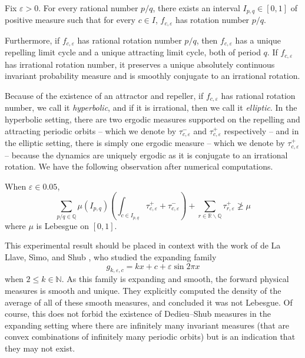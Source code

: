 \documentclass[10pt]{amsart}
\numberwithin{equation}{section}     %
\newcommand{\N}{\mathbb{N}} \newcommand{\Z}{\mathbb{Z}} \newcommand{\Q}{\mathbb{Q}} \newcommand{\R}{\mathbb{R}}
\renewcommand{\setminus}{\smallsetminus}
\renewcommand{\epsilon}{\varepsilon}
\begin{document}
\begin{theorem}
    Fix $\epsilon > 0$. For every rational number $p/q$, there exists an interval $I_{p,q} \in [0,1]$ of positive measure such that for every $c \in I$, $f_{c, \epsilon}$ has rotation number $p/q$.
  
Furthermore, if $f_{c,\epsilon}$ has rational rotation number $p/q$, then $f_{c,\epsilon}$ has a unique repelling limit cycle and a unique attracting limit cycle, both of period $q$. If $f_{c,\epsilon}$ has irrational rotation number, it preserves a unique absolutely continuous invariant probability measure and is smoothly conjugate to an irrational rotation.
\end{theorem}

Because of the existence of an attractor and repeller, if $f_{c,\varepsilon}$ has rational rotation number, we call it \textit{hyperbolic}, and if it is irrational, then we call it \textit{elliptic}. In the hyperbolic setting, there are two ergodic measures supported on the repelling and attracting periodic orbits -- which we denote by $\tau_{c,\varepsilon}^-$ and $\tau_{c,\varepsilon}^+$ respectively -- and in the elliptic setting, there is simply one ergodic measure -- which we denote by $\tau_{c,\varepsilon}^+$ -- because the dynamics are uniquely ergodic as it is conjugate to an irrational rotation.
We have the following observation after numerical computations.

\begin{claim}[Experimental] \label{experiment}
When $\varepsilon \in 0.05$, $$\sum_{p/q \in \Q} \mu(I_{p,q}) \left(\int_{c \in I_{p,q}} \tau_{c, \epsilon}^+ + \tau_{c, \epsilon}^- \right) + \sum_{r \in \R \setminus \Q} \tau_{r,\epsilon}^+ \not \geq \mu$$ where $\mu$ is Lebesgue on $[0,1]$.
\end{claim}



This experimental result should be placed in context with the work of de La Llave, Sìmo, and Shub \cite{dLL2008entropy}, who studied the expanding family $$g_{k,\varepsilon,c} = kx + c + \varepsilon \sin 2 \pi x$$ when $2 \leq k \in \N.$ As this family is expanding and smooth, the forward physical measures is smooth and unique.  They explicitly computed the density of the average of all of these smooth measures, and concluded it was not Lebesgue. Of course, this does not forbid the existence of Dedieu--Shub measures in the expanding setting where there are infinitely many invariant measures (that are convex combinations of infinitely many periodic orbits) but is an indication that they may not exist.
\end{document}
